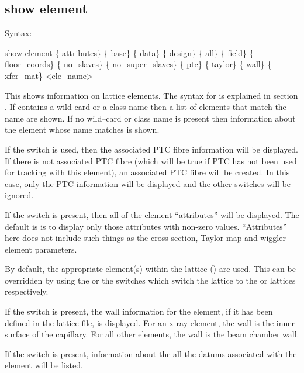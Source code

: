 {{{{{{{{%

\subsection{show element}
\label{s:show.element}

Syntax:
\begin{example}
  show element \{-attributes\} \{-base\} \{-data\} \{-design\} \{-all\} \{-field\}
      \{-floor_coords\} \{-no_slaves\} \{-no_super_slaves\} \{-ptc\} \{-taylor\} \{-wall\} 
      \{-xfer_mat\} <ele_name>
\end{example}

This shows information on lattice elements. The syntax for  is explained in section
. If  contains a wild card or a class name then a list of
elements that match the name are shown. If no wild--card or class name is present then information
about the element whose name matches  is shown.

If the  switch is used, then the associated PTC fibre information will be displayed. If
there is not associated PTC fibre (which will be true if PTC has not been used for tracking with
this element), an associated PTC fibre will be created. In this case, only the PTC information will
be displayed and the other switches will be ignored.

If the  switch is present, then all of the element ``attributes'' will be
displayed. The default is is to display only those attributes with non-zero values. ``Attributes''
here does not include such things as the cross-section, Taylor map and wiggler element parameters.

By default, the appropriate element(s) within the  lattice () are
used. This can be overridden by using the  or the  switches which switch the
lattice to the  or  lattices respectively.

If the  switch is present, the wall information for the element, if it has been defined in
the lattice file, is displayed. For an x-ray  element, the wall is the inner surface
of the capillary. For all other elements, the wall is the beam chamber wall.

If the  switch is present, information about the all the datums associated with the
element will be listed.

}}}}}}}}

